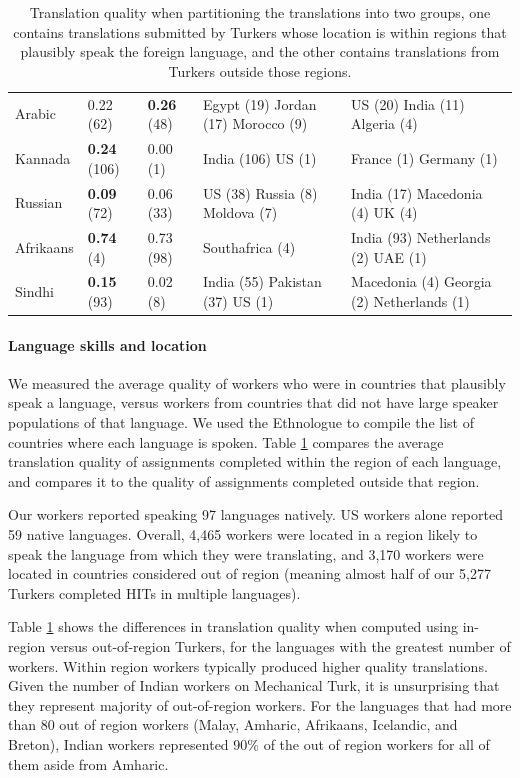 \documentclass[11pt]{article}
\begin{document}
\begin{table}
\begin{tabular}{lllll}
Arabic&0.22 (62) &\textbf{0.26} (48)&Egypt (19) Jordan (17) Morocco (9) &US (20) India (11) Algeria (4) \\
Kannada&\textbf{0.24} (106)&0.00 (1)&India (106) US (1) &France (1) Germany (1) \\
Russian&\textbf{0.09} (72)&0.06 (33)&US (38) Russia (8) Moldova (7) &India (17) Macedonia (4) UK (4) \\
Afrikaans&\textbf{0.74} (4)&0.73 (98)&Southafrica (4) &India (93) Netherlands (2) UAE (1) \\
Sindhi&\textbf{0.15} (93)&0.02 (8)&India (55) Pakistan (37) US (1) &Macedonia (4) Georgia (2) Netherlands (1) \\
\hline\hline
\end{tabular}
\normalsize
\caption{Translation quality when partitioning the translations into two groups, one contains translations submitted by Turkers whose location is within regions that plausibly speak the foreign language, and the other contains translations from Turkers outside those regions.} \label{region-summary}
\end{table}

\paragraph{Language skills and location}

We measured the average quality of workers who were in countries that plausibly speak a language, versus workers from countries that did not have large speaker populations of that language.  We used the Ethnologue \cite{ethnologue} to compile the list of countries where each language is spoken.  Table \ref{region-summary} compares the average translation quality of assignments completed within the region of each language, and compares it to the quality of assignments completed outside that region. 

Our workers reported speaking 97 languages natively. US workers alone reported 59 native languages. Overall, 4,465 workers were located in a region likely to speak the language from which they were translating, and 3,170 workers were located in countries considered out of region (meaning almost half of our 5,277 Turkers completed HITs in multiple languages). 

Table \ref{region-summary} shows the differences in translation quality when computed using in-region versus out-of-region Turkers, for the languages with the greatest number of workers.  Within region workers typically produced higher quality translations. 
Given the number of Indian workers on Mechanical Turk, it is unsurprising that they represent majority of out-of-region workers.  For the languages that had more than 80 out of region workers (Malay, Amharic, Afrikaans, Icelandic, and Breton), Indian workers represented 90\% of the out of region workers for all of them aside from Amharic.
\end{document}
